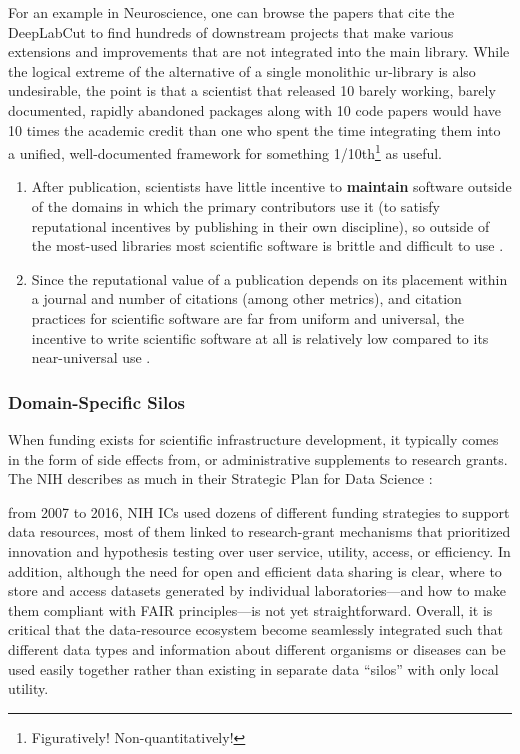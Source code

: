 \documentclass[11pt]{article}
\begin{document}
\begin{multicols}{2}
For an example in Neuroscience, one can browse the papers that cite the
DeepLabCut \cite{mathisDeepLabCutMarkerlessPose2018a}  to find
hundreds of downstream projects that make various extensions and
improvements that are not integrated into the main library. While the
logical extreme of the alternative of a single monolithic ur-library is
also undesirable, the point is that a scientist that released 10 barely
working, barely documented, rapidly abandoned packages along with 10
code papers would have 10 times the academic credit than one who spent
the time integrating them into a unified, well-documented framework for
something 1/10th\footnote{Figuratively! Non-quantitatively!} as useful.

\begin{enumerate}
\def\labelenumi{\arabic{enumi})}
\setcounter{enumi}{1}
\item
  After publication, scientists have little incentive to
  \textbf{maintain} software outside of the domains in which the primary
  contributors use it (to satisfy reputational incentives by publishing
  in their own discipline), so outside of the most-used libraries most
  scientific software is brittle and difficult to use \cite{mangulImprovingUsabilityArchival2019, kumarBioinformaticsSoftwareBiologists2007} .
\item
  Since the reputational value of a publication depends on its placement
  within a journal and number of citations (among other metrics), and
  citation practices for scientific software are far from uniform and
  universal, the incentive to write scientific software at all is
  relatively low compared to its near-universal use \cite{howisonSoftwareScientificLiterature2016} .
\end{enumerate}

\hypertarget{domain-specific-silos}{%
\subsubsection{Domain-Specific Silos}\label{domain-specific-silos}}

When funding exists for scientific infrastructure development, it
typically comes in the form of side effects from, or administrative
supplements to research grants. The NIH describes as much in their
Strategic Plan for Data Science \cite{NIH, StrategicPlan2018} :

\begin{leftbar}
from 2007 to 2016, NIH ICs used dozens of different funding strategies
to support data resources, most of them linked to research-grant
mechanisms that prioritized innovation and hypothesis testing over user
service, utility, access, or efficiency. In addition, although the need
for open and efficient data sharing is clear, where to store and access
datasets generated by individual laboratories---and how to make them
compliant with FAIR principles---is not yet straightforward. Overall, it
is critical that the data-resource ecosystem become seamlessly
integrated such that different data types and information about
different organisms or diseases can be used easily together rather than
existing in separate data ``silos'' with only local utility.
\end{leftbar}


\end{multicols}
\end{document}
